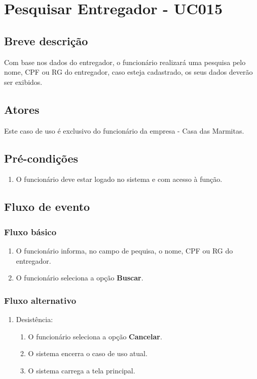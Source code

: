 \chapter{Pesquisar Entregador - UC015} \label{uc015}

\section{Breve descrição}

Com base nos dados do entregador, o funcionário realizará uma pesquisa pelo nome, CPF ou RG do entregador, caso esteja cadastrado, os seus dados deverão ser exibidos.

\section{Atores}

Este caso de uso é exclusivo do funcionário da empresa - Casa das Marmitas.

\section{Pré-condições}

\begin{enumerate}
	\item O funcionário deve estar logado no sistema e com acesso à função.
\end{enumerate}

\section{Fluxo de evento}

\subsection{Fluxo básico}

\begin{enumerate}
	\item O funcionário informa, no campo de pequisa, o nome, CPF ou RG do entregador.
	\item O funcionário seleciona a opção \textbf{Buscar}.
\end{enumerate}

\subsection{Fluxo alternativo}

\begin{enumerate}
	\item Desistência:
	\begin{enumerate}
		\item O funcionário seleciona a opção \textbf{Cancelar}.
		\item O sistema encerra o caso de uso atual.
		\item O sistema carrega a tela principal.
	\end{enumerate}
\end{enumerate}


